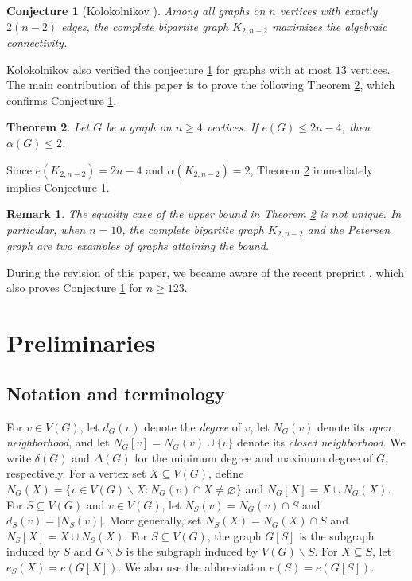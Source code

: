 \documentclass[11pt]{article}
\newtheorem{thm}{Theorem}
\newtheorem*{remark}{Remark}
\newtheorem{conj}[thm]{Conjecture}
\theoremstyle{definition}
\begin{document}
\begin{conj}[Kolokolnikov \cite{K15}]\label{conj::kolokolnikov}
  Among all graphs on $n$ vertices with exactly $2(n-2)$ edges, the complete bipartite graph $K_{2,n-2}$ maximizes the algebraic connectivity.
\end{conj}


Kolokolnikov\cite{K15} also verified the conjecture \ref{conj::kolokolnikov} for graphs with at most $13$ vertices. The main contribution of this paper is to prove the following Theorem \ref{thm::main1}, which confirms Conjecture \ref{conj::kolokolnikov}.

\begin{thm}\label{thm::main1}
  Let $G$ be a graph on $n\geq 4$ vertices. If $e(G)\leq 2n-4$, then $\alpha(G)\leq 2$.
\end{thm}

Since $e(K_{2,n-2})=2n-4$ and $\alpha(K_{2,n-2})=2$, Theorem \ref{thm::main1} immediately implies Conjecture \ref{conj::kolokolnikov}.


\begin{remark}
  The equality case of the upper bound in Theorem \ref{thm::main1} is not unique. In particular, when $n=10$, the complete bipartite graph $K_{2,n-2}$ and the Petersen graph are two examples of graphs attaining the bound.
\end{remark}

During the revision of this paper, we became aware of the recent preprint \cite{ZLRL26}, which also proves Conjecture \ref{conj::kolokolnikov} for $n\geq 123$.


\section{Preliminaries}

\subsection{Notation and terminology}
For $v\in V(G)$, let $d_G(v)$ denote the \emph{degree} of $v$, let $N_G(v)$ denote its \emph{open neighborhood}, and let $N_G[v]=N_G(v)\cup\{v\}$ denote its \emph{closed neighborhood}. We write $\delta(G)$ and $\Delta(G)$ for the minimum degree and maximum degree of $G$, respectively. For a vertex set $X\subseteq V(G)$, define $N_G(X)=\{v\in V(G)\backslash X: N_G(v)\cap X\neq\varnothing\}$ and $N_G[X]=X\cup N_G(X)$. For $S\subseteq V(G)$ and $v\in V(G)$, let $N_S(v)=N_G(v)\cap S$ and $d_S(v)=|N_S(v)|$. More generally, set $N_S(X)=N_G(X)\cap S$ and $N_S[X]=X\cup N_S(X)$. For $S\subseteq V(G)$, the graph $G[S]$ is the subgraph induced by $S$ and $G\backslash S$ is the subgraph induced by $V(G)\backslash S$. For $X\subseteq S$, let $e_S(X)=e(G[X])$. We also use the abbreviation $e(S)=e(G[S])$.
\end{document}
